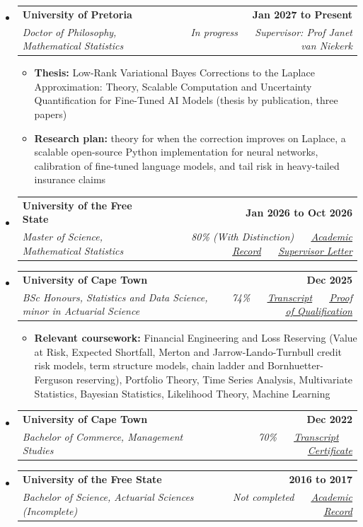 \documentclass[letterpaper,11pt]{article}
\makeatletter
\newcommand{\resumeItem}[1]{
  \item\small{
    {#1 \vspace{-1pt}}
  }
}
\newcommand{\resumeSubheading}[4]{
  \vspace{-2pt}\item
    \begin{tabular*}{1.0\textwidth}[t]{l@{\extracolsep{\fill}}r}
      \textbf{\large#1} & \textbf{\small #2} \\
      \textit{\large#3} & \textit{\small #4} \\

    \end{tabular*}\vspace{-7pt}
}
\newcommand{\resumeSubHeadingListStart}{\begin{itemize}[leftmargin=0.0in, label={}]}
\newcommand{\resumeSubHeadingListEnd}{\end{itemize}}
\newcommand{\resumeItemListStart}{\begin{itemize}[leftmargin=0.1in]}
\newcommand{\resumeItemListEnd}{\end{itemize}\vspace{-5pt}}
\makeatother
\begin{document}
\resumeSubHeadingListStart
    \resumeSubheading
      {University of Pretoria}{Jan 2027 to Present}
      {Doctor of Philosophy, Mathematical Statistics}{In progress ~\textbar~ Supervisor: Prof Janet van Niekerk}
      \resumeItemListStart
            \resumeItem{\small{\textbf{Thesis:} Low-Rank Variational Bayes Corrections to the Laplace Approximation: Theory, Scalable Computation and Uncertainty Quantification for Fine-Tuned AI Models (thesis by publication, three papers)}}
            \resumeItem{\small{\textbf{Research plan:} theory for when the correction improves on Laplace, a scalable open-source Python implementation for neural networks, calibration of fine-tuned language models, and tail risk in heavy-tailed insurance claims}}
      \resumeItemListEnd
    \vspace{3pt}
    \resumeSubheading
      {University of the Free State}{Jan 2026 to Oct 2026}
      {Master of Science, Mathematical Statistics}{80\% (With Distinction) ~\textbar~ \href{https://github.com/thabangTheActuaryCoder/Academic-Records/blob/master/UV_ACADREC_S\%20\%28Baloyi\%20Thabang\%20MSc\%29.pdf}{\color{blue}\underline{Academic Record}} ~\textbar~ \href{https://github.com/thabangTheActuaryCoder/Academic-Records/blob/master/Thabang\%20Baloyi\%20letter\%2010\%20September\%202026.pdf}{\color{blue}\underline{Supervisor Letter}}}
    \vspace{3pt}
    \resumeSubheading
      {University of Cape Town}{Dec 2025}
      {BSc Honours, Statistics and Data Science, minor in Actuarial Science}{74\% ~\textbar~ \href{https://github.com/thabangTheActuaryCoder/Academic-Records/blob/master/UCT\%20TRANSCRIPT\%202025.pdf}{\color{blue}\underline{Transcript}} ~\textbar~ \href{https://github.com/thabangTheActuaryCoder/Academic-Records/blob/master/Proof\%20of\%20Qualification\%20-\%20BSc.\%20Hons\%20Statistics\%20and\%20Data\%20Sciences.pdf}{\color{blue}\underline{Proof of Qualification}}}
      \resumeItemListStart
            \resumeItem{\small{\textbf{Relevant coursework:} Financial Engineering and Loss Reserving (Value at Risk, Expected Shortfall, Merton and Jarrow-Lando-Turnbull credit risk models, term structure models, chain ladder and Bornhuetter-Ferguson reserving), Portfolio Theory, Time Series Analysis, Multivariate Statistics, Bayesian Statistics, Likelihood Theory, Machine Learning}}
      \resumeItemListEnd
    \vspace{2pt}
    \resumeSubheading
      {University of Cape Town}{Dec 2022}
      {Bachelor of Commerce, Management Studies}{70\% ~\textbar~ \href{https://github.com/thabangTheActuaryCoder/Academic-Records/blob/master/UCT\%20TRANSCRIPT\%202025.pdf}{\color{blue}\underline{Transcript}} ~\textbar~ \href{https://github.com/thabangTheActuaryCoder/Academic-Records/blob/master/UCT\%20CERTIFICATE.pdf}{\color{blue}\underline{Certificate}}}
    \vspace{3pt}
    \resumeSubheading
      {University of the Free State}{2016 to 2017}
      {Bachelor of Science, Actuarial Sciences \textup{(Incomplete)}}{Not completed ~\textbar~ \href{https://github.com/thabangTheActuaryCoder/Academic-Records/blob/master/UV_ACADREC_S\%20\%28Baloyi\%20Thabang\%20MSc\%29.pdf}{\color{blue}\underline{Academic Record}}}
\resumeSubHeadingListEnd
\vspace{-2pt}
\end{document}
